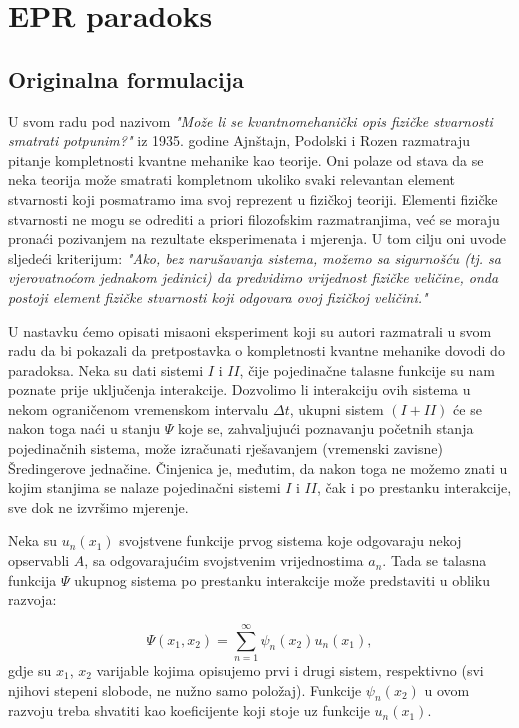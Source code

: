 \chapter{EPR paradoks}
\section{Originalna formulacija}
U svom radu pod nazivom {\it{"Može li se kvantnomehanički opis fizičke stvarnosti smatrati potpunim?"}} iz 1935. godine Ajnštajn, Podolski i Rozen razmatraju pitanje kompletnosti kvantne mehanike kao teorije.
Oni polaze od stava da se neka teorija može smatrati kompletnom ukoliko  svaki relevantan element stvarnosti koji posmatramo ima svoj reprezent u fizičkoj teoriji.
Elementi fizičke stvarnosti ne mogu se odrediti a priori filozofskim razmatranjima, već se moraju pronaći pozivanjem na rezultate eksperimenata i mjerenja. U tom cilju oni uvode sljedeći kriterijum: {\it{"Ako, bez narušavanja sistema, možemo sa sigurnošću (tj. sa vjerovatnoćom jednakom jedinici) da predvidimo vrijednost fizičke veličine, onda postoji element fizičke stvarnosti koji odgovara ovoj fizičkoj veličini."}}


U nastavku ćemo opisati misaoni eksperiment koji su autori razmatrali u svom radu da bi pokazali da pretpostavka o kompletnosti kvantne mehanike dovodi do paradoksa.
Neka su dati sistemi $I$ i $II$, čije pojedinačne talasne funkcije su nam poznate prije uklju\v cenja interakcije. Dozvolimo li interakciju ovih sistema u nekom ograničenom vremenskom intervalu $\Delta t$,
ukupni sistem $(I + II)$ će se nakon toga naći u stanju $\Psi$ koje se, zahvaljujući poznavanju početnih stanja pojedinačnih sistema,
može izračunati rješavanjem (vremenski zavisne) Šredingerove jednačine.
Činjenica je, međutim, da nakon toga ne možemo znati u kojim stanjima se nalaze pojedinačni sistemi $I$ i $II$, čak i po prestanku interakcije, sve dok ne izvršimo mjerenje.

Neka su $u_n(x_1)$ svojstvene funkcije prvog sistema koje odgovaraju nekoj opservabli $A$, sa odgovarajućim svojstvenim vrijednostima $a_n$.
Tada se talasna funkcija $\Psi$ ukupnog sistema po prestanku interakcije može predstaviti u obliku razvoja:

\begin{equation}
    \Psi(x_1, x_2) = \sum_{n=1}^{\infty} \psi_n(x_2)u_n(x_1), \label{eq:talasna_funkcija_ukupnog_sistema_nakon_interakcije}
\end{equation}
gdje su $x_1$, $x_2$ varijable kojima opisujemo prvi i drugi sistem, respektivno (svi njihovi stepeni slobode, ne nužno samo položaj).
Funkcije $\psi_n(x_2)$ u ovom razvoju treba shvatiti kao koeficijente koji stoje uz funkcije $u_n(x_1)$.

